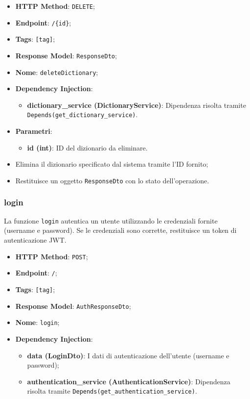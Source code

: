 \begin{itemize}
\item \textbf{HTTP Method}: \texttt{DELETE};
\item \textbf{Endpoint}: \texttt{/\{id\}};
\item \textbf{Tags}: \texttt{[tag]};
\item \textbf{Response Model}: \texttt{ResponseDto};
\item \textbf{Nome}: \texttt{deleteDictionary};
\item \textbf{Dependency Injection}:
\begin{itemize}
\item \textbf{dictionary\_service (DictionaryService)}: Dipendenza risolta tramite \texttt{Depends(get\_dictionary\_service)}.
\end{itemize}
\item \textbf{Parametri}:
\begin{itemize}
\item \textbf{id (int)}: ID del dizionario da eliminare.
\end{itemize}
\end{itemize}

\begin{itemize}
\item Elimina il dizionario specificato dal sistema tramite l'ID fornito;
\item Restituisce un oggetto \texttt{ResponseDto} con lo stato dell'operazione.
\end{itemize}


\subsubsection{login}

\par La funzione \texttt{login} autentica un utente utilizzando le credenziali fornite (username e password). Se le credenziali sono corrette, restituisce un token di autenticazione JWT.

\begin{itemize}
\item \textbf{HTTP Method}: \texttt{POST};
\item \textbf{Endpoint}: \texttt{/};
\item \textbf{Tags}: \texttt{[tag]};
\item \textbf{Response Model}: \texttt{AuthResponseDto};
\item \textbf{Nome}: \texttt{login};
\item \textbf{Dependency Injection}:
\begin{itemize}
\item \textbf{data (LoginDto)}: I dati di autenticazione dell'utente (username e password);
\item \textbf{authentication\_service (AuthenticationService)}: Dipendenza risolta tramite \texttt{Depends(get\_authentication\_service)}.
\end{itemize}
\end{itemize}

